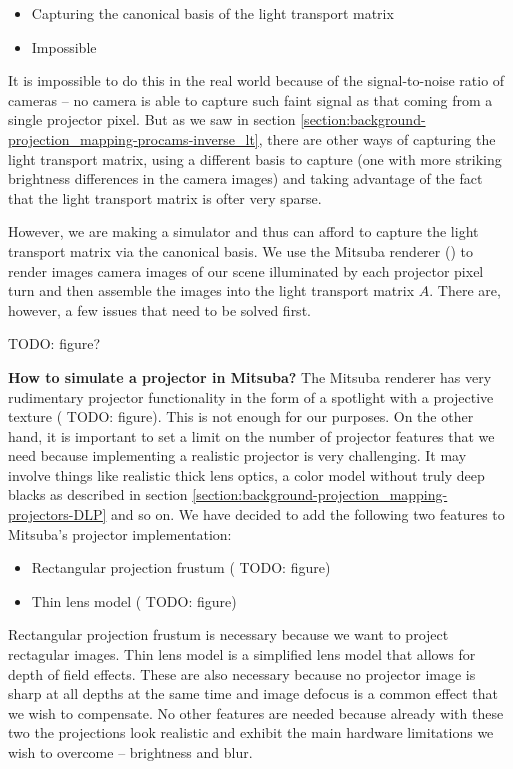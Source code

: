\begin{itemize}
    \item Capturing the canonical basis of the light transport matrix
    \item Impossible
\end{itemize}

It is impossible to do this in the real world because of the signal-to-noise ratio of cameras -- no camera is able to capture such faint signal as that coming from a single projector pixel. But as we saw in section \ref{section:background-projection_mapping-procams-inverse_lt}, there are other ways of capturing the light transport matrix, using a different basis to capture (one with more striking brightness differences in the camera images) and taking advantage of the fact that the light transport matrix is ofter very sparse.

However, we are making a simulator and thus can afford to capture the light transport matrix via the canonical basis. We use the Mitsuba renderer (\citet{Mitsuba}) to render images camera images of our scene illuminated by each projector pixel turn and then assemble the images into the light transport matrix \(A\). There are, however, a few issues that need to be solved first.

{\color{red} TODO: figure?}

\textbf{How to simulate a projector in Mitsuba?} The Mitsuba renderer has very rudimentary projector functionality in the form of a spotlight with a projective texture ({\color{red} TODO: figure}). This is not enough for our purposes. On the other hand, it is important to set a limit on the number of projector features that we need because implementing a realistic projector is very challenging. It may involve things like realistic thick lens optics, a color model without truly deep blacks as described in section \ref{section:background-projection_mapping-projectors-DLP} and so on. We have decided to add the following two features to Mitsuba's projector implementation:

\begin{itemize}
    \item Rectangular projection frustum ({\color{red} TODO: figure})
    \item Thin lens model ({\color{red} TODO: figure})
\end{itemize}

Rectangular projection frustum is necessary because we want to project rectagular images. Thin lens model is a simplified lens model that allows for depth of field effects. These are also necessary because no projector image is sharp at all depths at the same time and image defocus is a common effect that we wish to compensate. No other features are needed because already with these two the projections look realistic and exhibit the main hardware limitations we wish to overcome -- brightness and blur.

